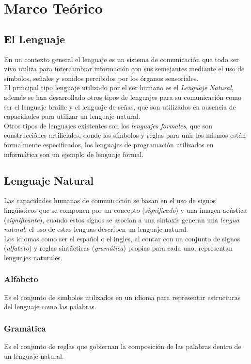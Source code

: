 \chapter{Marco Te\'orico}
\section{El Lenguaje}
En un contexto general el lenguaje es un sistema de comunicaci\'on que todo ser vivo 
utiliza para intercambiar informaci\'on con sus semejantes mediante el uso de
s\'imbolos, se\~nales y sonidos percibidos por los \'organos sensoriales. \\

El principal tipo lenguaje utilizado por el ser humano es el \emph{Lenguaje Natural}, 
adem\'as se han desarrollado otros tipos de lenguajes para su comunicaci\'on como ser 
el lenguaje braille y el lenguaje de se\~nas, que son utilizados en ausencia de 
capacidades para utilizar un lenguaje natural. \\

Otros tipos de lenguajes existentes son los \emph{lenguajes formales}, que
son construcci\'ones artificiales, donde los s\'imbolos y reglas para unir los mismos
est\'an formalmente especificados, los lenguajes de programaci\'on utilizados en 
inform\'atica son un ejemplo de lenguaje formal.

\section{Lenguaje Natural}
Las capacidades humanas de comunicaci\'on se basan en el uso de signos ling\"uisticos
que se componen por un concepto (\emph{significado}) y una imagen ac\'ustica
(\emph{significante}), cuando estos signos se asocian a una sintaxis generan  una
\emph{lengua natural}, el uso de estas lenguas describen un lenguaje natural. \\

Los idiomas como ser el espa\~nol o el ingles, al contar con un conjunto de signos
(\emph{alfabeto}) y reglas sint\'acticas (\emph{gram\'atica}) propias para cada uno,
representan lenguajes naturales.

\subsection{Alfabeto}
Es el conjunto de simbolos utilizados en un idioma para representar estructuras del
lenguaje como las palabras.


\subsection{Gram\'atica}
Es el conjunto de reglas que gobiernan la composici\'on de las palabras dentro de un
lenguaje natural.

